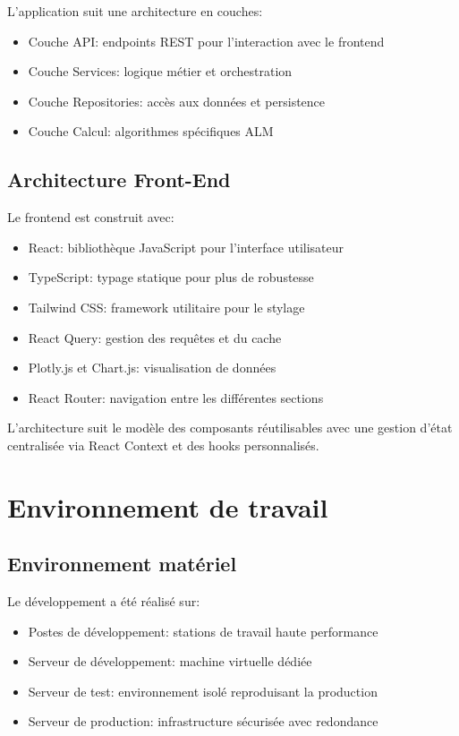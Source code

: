 \documentclass[12pt,a4paper]{report}
\begin{document}
L'application suit une architecture en couches:
\begin{itemize}
    \item Couche API: endpoints REST pour l'interaction avec le frontend
    \item Couche Services: logique métier et orchestration
    \item Couche Repositories: accès aux données et persistence
    \item Couche Calcul: algorithmes spécifiques ALM
\end{itemize}

\subsection{Architecture Front-End}
Le frontend est construit avec:
\begin{itemize}
    \item React: bibliothèque JavaScript pour l'interface utilisateur
    \item TypeScript: typage statique pour plus de robustesse
    \item Tailwind CSS: framework utilitaire pour le stylage
    \item React Query: gestion des requêtes et du cache
    \item Plotly.js et Chart.js: visualisation de données
    \item React Router: navigation entre les différentes sections
\end{itemize}

L'architecture suit le modèle des composants réutilisables avec une gestion d'état centralisée via React Context et des hooks personnalisés.

\section{Environnement de travail}

\subsection{Environnement matériel}
Le développement a été réalisé sur:
\begin{itemize}
    \item Postes de développement: stations de travail haute performance
    \item Serveur de développement: machine virtuelle dédiée
    \item Serveur de test: environnement isolé reproduisant la production
    \item Serveur de production: infrastructure sécurisée avec redondance
\end{itemize}
\end{document}
